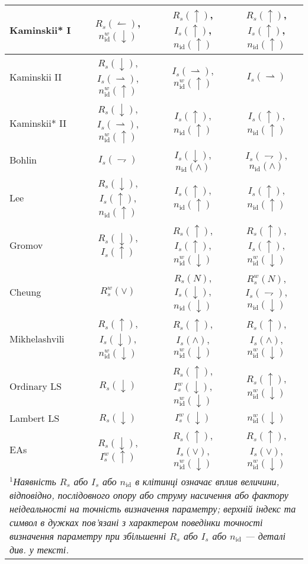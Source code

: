 \begin{table}
\begin{tabular}{|l|c|c|c|}
\hline
Kaminskii* I&$R_s(\leftharpoonup)$, $n_\mathrm{id}^w(\downarrow)$&$R_s(\uparrow)$, $I_s(\uparrow)$, $n_\mathrm{id}(\uparrow)$& $R_s(\uparrow)$, $I_s(\uparrow)$, $n_\mathrm{id}(\uparrow)$\\
\hline
Kaminskii II&$R_s(\downarrow)$, $I_s(\rightharpoonup)$, $n_\mathrm{id}^w(\uparrow)$&$I_s(\rightharpoonup)$, $n_\mathrm{id}^w(\uparrow)$& $I_s(\rightharpoonup)$\\
\hline
Kaminskii* II&$R_s(\downarrow)$, $I_s(\rightharpoonup)$, $n_\mathrm{id}^w(\uparrow)$&$I_s(\uparrow)$, $n_\mathrm{id}(\uparrow)$& $I_s(\uparrow)$, $n_\mathrm{id}(\uparrow)$\\
\hline
Bohlin &$I_s(\rightharpoondown)$&$I_s(\downarrow)$, $n_\mathrm{id}(\wedge)$& $I_s(\rightharpoondown)$, $n_\mathrm{id}(\wedge)$\\
\hline
Lee &$R_s(\downarrow)$, $I_s(\uparrow)$, $n_\mathrm{id}(\uparrow)$&$I_s(\uparrow)$, $n_\mathrm{id}(\uparrow)$& $I_s(\uparrow)$, $n_\mathrm{id}(\uparrow)$\\
\hline
Gromov &$R_s(\downarrow)$, $I_s(\uparrow)$&$R_s(\uparrow)$, $I_s(\uparrow)$, $n_\mathrm{id}^w(\downarrow)$&$R_s(\uparrow)$, $I_s(\uparrow)$, $n_\mathrm{id}^w(\downarrow)$\\
\hline
Cheung &$R_s^w(\vee)$&$R_s(N)$, $I_s(\downarrow)$, $n_\mathrm{id}(\downarrow)$&$R_s^w(N)$, $I_s(\rightharpoondown)$, $n_\mathrm{id}(\downarrow)$\\
\hline
Mikhelashvili &$R_s(\uparrow)$, $I_s(\downarrow)$, $n_\mathrm{id}^w(\downarrow)$&$R_s(\uparrow)$, $I_s(\wedge)$, $n_\mathrm{id}^w(\downarrow)$&$R_s(\uparrow)$, $I_s(\wedge)$, $n_\mathrm{id}^w(\downarrow)$\\
\hline
Ordinary LS &$R_s(\downarrow)$&$R_s(\uparrow)$, $I_s^w(\downarrow)$, $n_\mathrm{id}^w(\downarrow)$&$R_s(\uparrow)$, $n_\mathrm{id}^w(\downarrow)$\\
\hline
Lambert LS &$R_s(\downarrow)$&$I_s^w(\downarrow)$&$n_\mathrm{id}^w(\downarrow)$\\
\hline
EAs &$R_s(\downarrow)$, $I_s^w(\uparrow)$&$R_s(\uparrow)$, $I_s(\vee)$, $n_\mathrm{id}^w(\downarrow)$&$R_s(\uparrow)$, $I_s(\vee)$, $n_\mathrm{id}^w(\downarrow)$\\
\hline
\multicolumn{4}{|p{\textwidth}|}{$^{1}$\textit{Наявність $R_s$ або $I_s$ або $n_\mathrm{id}$ в клітинці означає
вплив величини, відповідно, послідовного опору або струму насичення або фактору неідеальності на точність визначення параметру;
верхній індекс та символ в дужках пов'язані з характером поведінки точності визначення параметру при збільшенні $R_s$ або $I_s$ або $n_\mathrm{id}$ --- деталі див. у тексті.
}}\\
\hline
\end{tabular}
\end{table}

